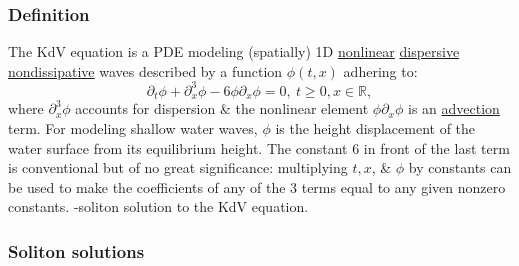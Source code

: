 \documentclass{article}
\begin{document}
\subsubsection{Definition}
The KdV equation is a PDE modeling (spatially) 1D \href{https://en.wikipedia.org/wiki/Nonlinear}{nonlinear} \href{https://en.wikipedia.org/wiki/Dispersion_relation}{dispersive} \href{https://en.wikipedia.org/wiki/Time_reversibility}{nondissipative} waves described by a function $\phi(t,x)$ adhering to:
\begin{equation}
	\partial_t\phi + \partial_x^3\phi - 6\phi\partial_x\phi = 0,\ t\ge0,x\in\mathbb{R},
\end{equation}
where $\partial_x^3\phi$ accounts for dispersion \& the nonlinear element $\phi\partial_x\phi$ is an \href{https://en.wikipedia.org/wiki/Advection}{advection} term. For modeling shallow water waves, $\phi$ is the height displacement of the water surface from its equilibrium height. The constant 6 in front of the last term is conventional but of no great significance: multiplying $t,x$, \& $\phi$ by constants can be used to make the coefficients of any of the 3 terms equal to any given nonzero constants. {-soliton solution to the KdV equation.}

\subsubsection{Soliton solutions}
\end{document}

